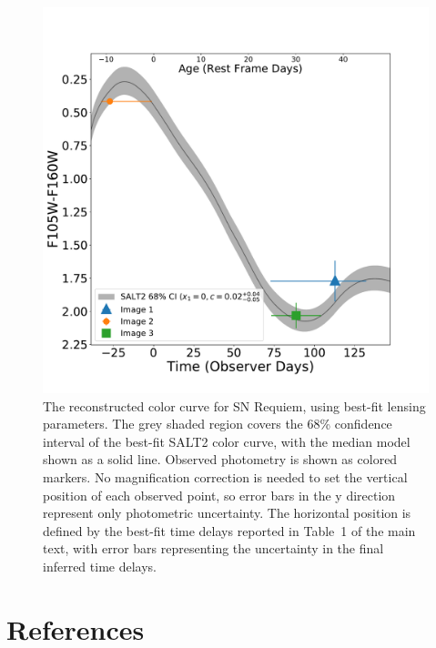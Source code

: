 \documentclass[12pt,dvipsnames]{article}
\def\SNABC{SN Requiem\xspace}
\begin{document}
\begin{figure}[h!]
    \centering
    \includegraphics[width=\textwidth]{Paper/Figures/full_colorcurve_total.pdf}
    \caption{\label{fig:full_colorcurve} The reconstructed color curve for \SNABC, using best-fit lensing parameters. The grey shaded region covers the 68\% confidence interval of the best-fit SALT2 color curve, with the median model shown as a solid line. Observed photometry is shown as colored markers.  No magnification correction is needed to set the vertical position of each observed point, so error bars in the y direction represent only photometric uncertainty. The horizontal position is defined by the best-fit time delays reported in Table~1 of the main text, with error bars 
    representing the uncertainty in the final inferred time delays. }
\end{figure}
\clearpage
\section*{References}
\end{document}
